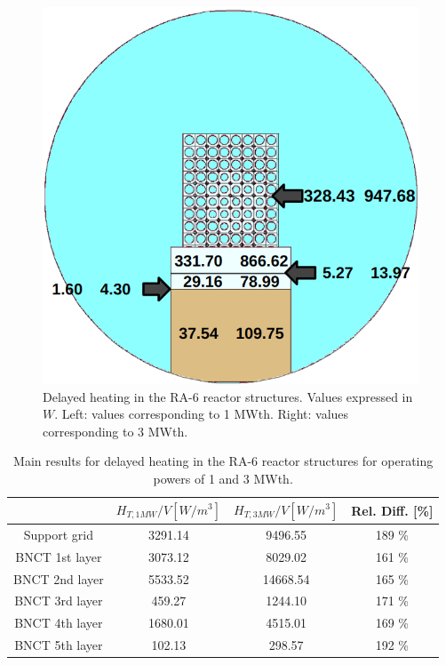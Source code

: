 \begin{figure}[htbp!] %
    \centering
    \includegraphics[width=0.75\linewidth]{figures/results_b}
    \hfill
    \caption{Delayed heating in the RA-6 reactor structures. Values expressed in $W$. Left: values corresponding to 1 MWth. Right: values corresponding to 3 MWth.}
    \label{fig:ra6-3}
\end{figure}

\begin{table}[htbp!]
  \centering
  \caption{Main results for delayed heating in the RA-6 reactor structures for operating powers of 1 and 3 MWth.}
  \label{tab:ra6-res}
  \begin{tabular}{cccc}
    \toprule
                    & $H_{T, 1MW}/V [W/m^3]$  & $H_{T, 3MW}/V [W/m^3]$  & Rel. Diff. [\%]  \\
    \midrule
    Support grid    &  3291.14                &  9496.55                &  189 \%   \\
    BNCT 1st layer  &  3073.12                &  8029.02                &  161 \%   \\
    BNCT 2nd layer  &  5533.52                & 14668.54                &  165 \%   \\
    BNCT 3rd layer  &   459.27                &  1244.10                &  171 \%   \\
    BNCT 4th layer  &  1680.01                &  4515.01                &  169 \%   \\
    BNCT 5th layer  &   102.13                &  298.57                 &  192 \%   \\
    \bottomrule
  \end{tabular}
\end{table}


